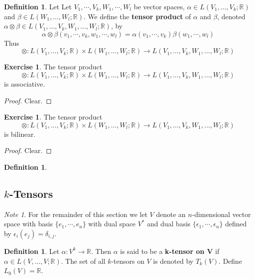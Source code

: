 \documentclass[12pt]{amsart}
\theoremstyle{definition}
\newtheorem{defn}[definition]{Definition}
\theoremstyle{remark}
\newtheorem{note}[remark]{Note}
\theoremstyle{definition}
\newtheorem{ex}[definition]{Exercise}
\newcommand{\al}{\alpha}
\newcommand{\bet}{\beta}
\newcommand{\del}{\delta}
\newcommand{\ep}{\epsilon}
\newcommand{\R}{\mathbb{R}}
\begin{document}
	\begin{defn}
		Let Let $V_1, \cdots, V_k, W_1, \cdots, W_l$ be vector spaces, $\al \in L(V_1, \dots, V_k; \R)$ and $\bet \in L(W_1, \dots, W_l; \R)$. We define the \textbf{tensor product} of $\al$ and $\beta$, denoted $\al \otimes \beta \in L(V_1, \dots, V_k, W_1, \dots, W_l; \R)$, by $$\al \otimes \beta (v_1, \cdots, v_k, w_{1}, \cdots, w_{l}) = \al(v_1, \cdots, v_k) \beta(w_{1}, \cdots, w_{l})$$  
		Thus $$\otimes: L(V_1, \dots, V_k; \R) \times L(W_1, \dots, W_l; \R) \rightarrow L(V_1, \dots, V_k, W_1, \dots, W_l; \R)$$
	\end{defn}

	\begin{ex}
		The tensor product $$\otimes: L(V_1, \dots, V_k; \R) \times L(W_1, \dots, W_l; \R) \rightarrow L(V_1, \dots, V_k, W_1, \dots, W_l; \R)$$ is associative.
	\end{ex}

	\begin{proof}
		Clear.
	\end{proof}
	
	\begin{ex}
		The tensor product $$\otimes: L(V_1, \dots, V_k; \R) \times L(W_1, \dots, W_l; \R) \rightarrow L(V_1, \dots, V_k, W_1, \dots, W_l; \R)$$ is bilinear.
	\end{ex}

	\begin{proof}
		Clear.
	\end{proof}	
	
	\begin{defn}
	
	\end{defn}

	\subsection{$k$-Tensors}	
	
	\begin{note}
		For the remainder of this section we let $V$ denote an $n$-dimensional vector space with basis $\{e_1, \cdots, e_n\}$ with dual space $V^*$ and dual basis $\{\ep_1, \cdots, \ep_n\}$ defined by $\ep_i(e_j) = \del_{i,j}$. 
	\end{note}
	
	\begin{defn}
		Let $\al: V^k \rightarrow \R$. Then $\alpha$ is said to be a \textbf{k-tensor on V} if $\al \in L(V, \dots, V; \R)$. The set of all $k$-tensors on $V$ is denoted by $T_k(V)$. Define $L_0(V) = \R$.
	\end{defn}
\end{document}
